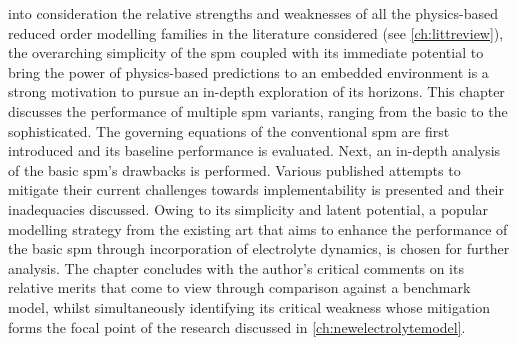 

 into consideration the  relative strengths and weaknesses
of  all the  physics-based reduced  order modelling  families in  the literature
considered  (see  \cref{ch:littreview}),  the   overarching  simplicity  of  the
\gls{spm}  coupled  with   its  immediate  potential  to  bring   the  power  of
physics-based predictions to  an embedded environment is a  strong motivation to
pursue  an in-depth  exploration of  its  horizons. This  chapter discusses  the
performance  of multiple  \gls{spm}  variants,  ranging from  the  basic to  the
sophisticated. The governing  equations of the conventional  \gls{spm} are first
introduced and its baseline performance is evaluated. Next, an in-depth analysis
of the basic  \gls{spm}'s drawbacks is performed. Various  published attempts to
mitigate  their current  challenges  towards implementability  is presented  and
their  inadequacies discussed.  Owing to  its simplicity  and latent  potential,
a  popular  modelling strategy  from  the  existing  art  that aims  to  enhance
the  performance of  the basic  \gls{spm} through  incorporation of  electrolyte
dynamics,  is  chosen for  further  analysis.  The  chapter concludes  with  the
author's critical  comments on  its relative  merits that  come to  view through
comparison  against a  benchmark  model, whilst  simultaneously identifying  its
critical  weakness  whose mitigation  forms  the  focal  point of  the  research
discussed in \cref{ch:newelectrolytemodel}.

